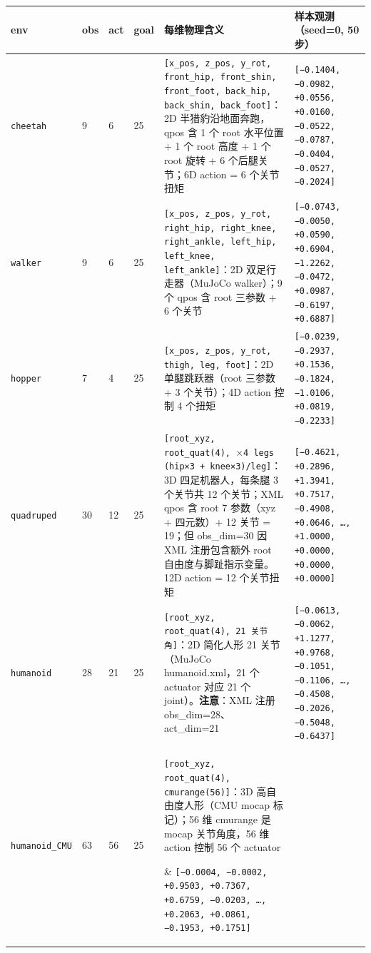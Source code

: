 \documentclass[11pt,a4paper]{article}
\begin{document}
\begingroup\scriptsize
\begin{longtable}{p{}p{}p{}p{}p{}p{}}
\toprule
\textbf{env} & \textbf{obs} & \textbf{act} & \textbf{goal} & \textbf{每维物理含义} & \textbf{样本观测（seed=0, 50 步）} \\
\midrule
\endhead
\texttt{cheetah}         & 9  & 6 & 25 & \texttt{[x\_pos, z\_pos, y\_rot, front\_hip, front\_shin, front\_foot, back\_hip, back\_shin, back\_foot]}：2D 半猎豹沿地面奔跑，qpos 含 1 个 root 水平位置 + 1 个 root 高度 + 1 个 root 旋转 + 6 个后腿关节；6D action = 6 个关节扭矩 & \texttt{[−0.1404, −0.0982, +0.0556, +0.0160, −0.0522, −0.0787, −0.0404, −0.0527, −0.2024]} \\
\texttt{walker}          & 9  & 6 & 25 & \texttt{[x\_pos, z\_pos, y\_rot, right\_hip, right\_knee, right\_ankle, left\_hip, left\_knee, left\_ankle]}：2D 双足行走器（MuJoCo walker）；9 个 qpos 含 root 三参数 + 6 个关节 & \texttt{[−0.0743, −0.0050, +0.0590, +0.6904, −1.2262, −0.0472, +0.0987, −0.6197, +0.6887]} \\
\texttt{hopper}          & 7  & 4 & 25 & \texttt{[x\_pos, z\_pos, y\_rot, thigh, leg, foot]}：2D 单腿跳跃器（root 三参数 + 3 个关节）；4D action 控制 4 个扭矩 & \texttt{[−0.0239, −0.2937, +0.1536, −0.1824, −1.0106, +0.0819, −0.2233]} \\
\texttt{quadruped}       & 30 & 12 & 25 & \texttt{[root\_xyz, root\_quat(4), $\times$4 legs (hip×3 + knee×3)/leg]}：3D 四足机器人，每条腿 3 个关节共 12 个关节；XML qpos 含 root 7 参数（xyz + 四元数）+ 12 关节 = 19；但 obs\_dim=30 因 XML 注册包含额外 root 自由度与脚趾指示变量。12D action = 12 个关节扭矩 & \texttt{[−0.4621, +0.2896, +1.3941, +0.7517, −0.4908, +0.0646, …, +1.0000, +0.0000, +0.0000, +0.0000]} \\
\texttt{humanoid}        & 28 & 21 & 25 & \texttt{[root\_xyz, root\_quat(4), 21 关节角]}：2D 简化人形 21 关节（MuJoCo humanoid.xml，21 个 actuator 对应 21 个 joint）。\textbf{注意}：XML 注册 obs\_dim=28、act\_dim=21 & \texttt{[−0.0613, −0.0062, +1.1277, +0.9768, −0.1051, −0.1106, …, −0.4508, −0.2026, −0.5048, −0.6437]} \\
\texttt{humanoid\_CMU}   & 63 & 56 & 25 & \parbox[t]{0.38\textwidth}{\raggedright\texttt{[root\_xyz, root\_quat(4), cmurange(56)]}：3D 高自由度人形（CMU mocap 标记）；56 维 cmurange 是 mocap 关节角度，56 维 action 控制 56 个 actuator} & \texttt{[−0.0004, −0.0002, +0.9503, +0.7367, +0.6759, −0.0203, …, +0.2063, +0.0861, −0.1953, +0.1751]} \\

\end{longtable}
\end{document}
